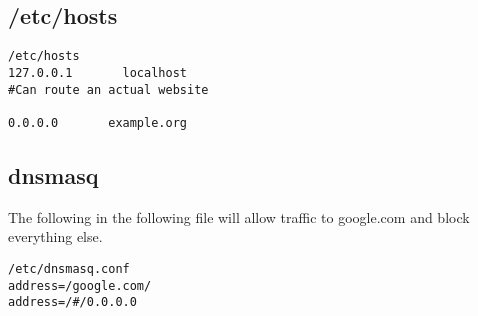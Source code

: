 
\subsection{/etc/hosts}

\begin{verbatim}
/etc/hosts
127.0.0.1       localhost
#Can route an actual website

0.0.0.0       example.org
\end{verbatim}


\subsection{dnsmasq}

The following in the following file will allow traffic to google.com and block everything else.

\begin{verbatim}
/etc/dnsmasq.conf
address=/google.com/
address=/#/0.0.0.0
\end{verbatim}
